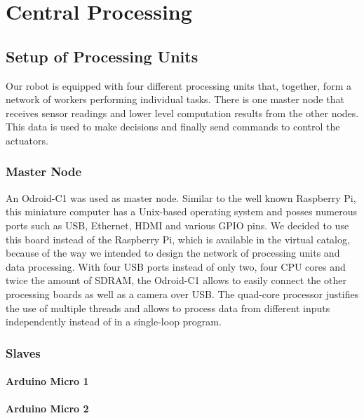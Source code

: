%
%   
%

\chapter{Central Processing}

\section{Setup of Processing Units}
Our robot is equipped with four different processing units that, together,
form a network of workers performing individual tasks. There is one master
node that receives sensor readings and lower level computation results from
the other nodes. This data is used to make decisions and finally send 
commands to control the actuators.


\subsection{Master Node}
An Odroid-C1 was used as master node. Similar to the well known Raspberry Pi,
this miniature computer has a Unix-based operating system and posses numerous
ports such as USB, Ethernet, HDMI and various GPIO pins. We decided to use this
board instead of the Raspberry Pi, which is available in the virtual catalog,
because of the way we intended to design the network of processing units and 
data processing. With four USB ports instead of only two, four CPU cores and twice 
the amount of SDRAM, the Odroid-C1 allows to easily connect the other processing 
boards as well as a camera over USB. The quad-core processor justifies the use
of multiple threads and allows to process data from different inputs independently
instead of in a single-loop program.

\subsection{Slaves} 
\subsubsection{Arduino Micro 1}
\subsubsection{Arduino Micro 2}
